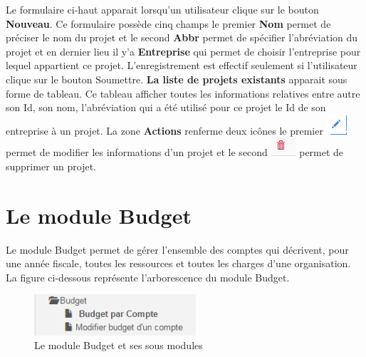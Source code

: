 \documentclass[12pt,a4paper]{report}
\begin{document}
Le formulaire ci-haut apparait lorsqu'un utilisateur clique sur le bouton \textbf{Nouveau}. Ce formulaire possède cinq champs le premier \textbf{Nom} permet de préciser le nom du projet et le second \textbf{Abbr} permet de spécifier l'abréviation du projet et en dernier lieu il y'a \textbf{Entreprise} qui permet de choisir l'entreprise pour lequel appartient ce projet.
L'enregistrement est effectif seulement si l'utilisateur clique sur le bouton Soumettre. \textbf{La liste de projets existants} apparait sous forme de tableau. Ce tableau afficher toutes les informations relatives entre autre son Id, son nom, l'abréviation qui a été utilisé pour ce projet le Id de son entreprise à un projet. La zone \textbf{Actions} renferme deux icônes le premier \includegraphics[scale=0.7]{pic/EditUser.png}  permet de modifier les informations d'un projet et le second \includegraphics[scale=0.7]{pic/DeleteWRed.png} permet de supprimer un projet.



\newpage
\chapter{Le module Budget}        

Le module Budget permet de gérer l'ensemble des comptes qui décrivent, pour une année fiscale, toutes les ressources et toutes les charges d'une organisation. La figure ci-dessous représente l'arborescence du module Budget.

\begin{figure}[h]
\begin{center}
\includegraphics[width=6cm]{pic/ArboBudget.png}
\end{center}
\caption{Le module Budget et ses sous modules}
\label{Le module Budget et ses sous menus}
\end{figure} 
\end{document}
